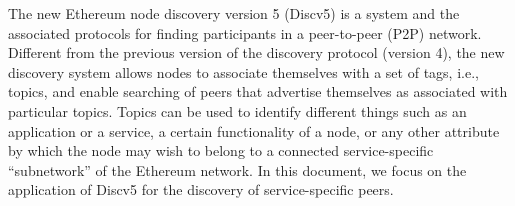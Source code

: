 %
%
%
%
%




The new Ethereum node discovery version 5 (Discv5) is a system and the associated protocols for finding participants in a peer-to-peer (P2P) network. Different from the previous version of the discovery protocol (version 4), the new discovery system allows nodes to associate themselves with a set of tags, i.e., topics, and enable searching of peers that advertise themselves as associated with particular topics. Topics can be used to identify different things such as an application or a service, a certain functionality of a node, or any other attribute by which the node may wish to belong to a connected service-specific “subnetwork” of the Ethereum network. In this document, we focus on the application of Discv5 for the discovery of service-specific peers.



